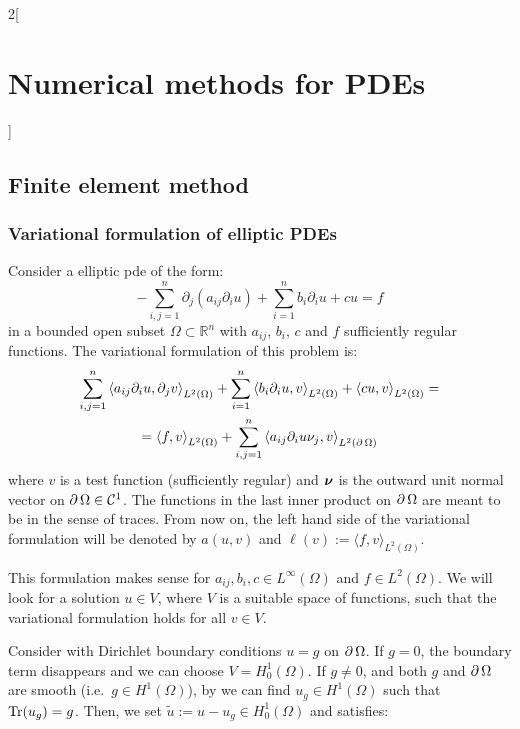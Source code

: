 \documentclass[../../../main_math.tex]{subfiles}
\begin{document}
\begin{multicols}{2}[\section{Numerical methods for PDEs}]
  \subsection{Finite element method}
  \subsubsection{Variational formulation of elliptic PDEs}
  \begin{definition}
    Consider a elliptic pde of the form:
    \begin{equation}\label{NMPDE:elliptic_pde}
      -\sum_{i,j=1}^n\partial_j(a_{ij}\partial_i u)+\sum_{i=1}^n b_i\partial_i u+cu=f
    \end{equation}
    in a bounded open subset $\Omega\subset\mathbb{R}^n$ with $a_{ij}$, $b_i$, $c$ and $f$ sufficiently regular functions. The variational formulation of this problem is:
    \begin{multline*}
      \sum_{i,j=1}^n{\langle a_{ij}\partial_i u,\partial_j v\rangle}_{L^2(\Omega)}+\sum_{i=1}^n{\langle b_i\partial_i u,v\rangle}_{L^2(\Omega)}+{\langle cu,v\rangle}_{L^2(\Omega)}=\\={\langle f,v\rangle}_{L^2(\Omega)}+\sum_{i,j=1}^n{\langle a_{ij}\partial_i u\nu_j,v\rangle}_{L^2(\operatorname{\partial}{\Omega})}
    \end{multline*}
    where $v$ is a test function (sufficiently regular) and $\boldsymbol{\mathrm{\nu}}$ is the outward unit normal vector on $\operatorname{\partial}\Omega\in\mathcal{C}^1$. The functions in the last inner product on $\operatorname{\partial}\Omega$ are meant to be in the sense of traces. From now on, the left hand side of the variational formulation will be denoted by $a(u,v)$ and $\ell(v):={\langle f,v\rangle}_{L^2(\Omega)}$.
  \end{definition}
  \begin{remark}
    This formulation makes sense for $a_{ij},b_i,c\in L^\infty(\Omega)$ and $f\in L^2(\Omega)$. We will look for a solution $u\in V$, where $V$ is a suitable space of functions, such that the variational formulation holds for all $v\in V$.
  \end{remark}
  \begin{definition}
    Consider  with Dirichlet boundary conditions $u=g$ on $\operatorname{\partial}\Omega$. If $g=0$, the boundary term disappears and we can choose $V=H^1_0(\Omega)$. If $g\neq 0$, and both $g$ and $\operatorname{\partial}\Omega$ are smooth (i.e.\ $g\in H^1(\Omega)$), by  we can find $u_g\in H^1(\Omega)$ such that $\Tr(u_g)=g$. Then, we set $\tilde{u}:=u-u_g\in H^1_0(\Omega)$ and satisfies:

\end{definition}
\end{multicols}
\end{document}
